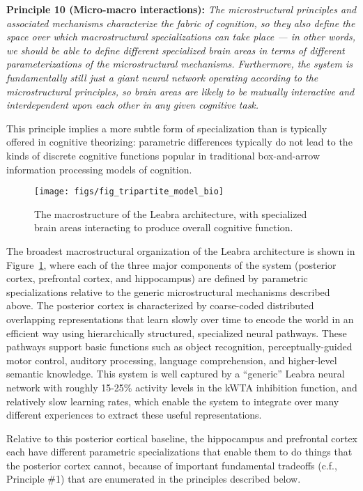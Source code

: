 \documentclass[11pt,twoside]{article}
\begin{document}
{\bf Principle 10 (Micro-macro interactions):} {\em The microstructural
  principles and associated mechanisms characterize the fabric of cognition,
  so they also define the space over which macrostructural specializations can
  take place --- in other words, we should be able to define different
  specialized brain areas in terms of different parameterizations of the
  microstructural mechanisms.  Furthermore, the system is fundamentally still
  just a giant neural network operating according to the microstructural
  principles, so brain areas are likely to be mutually interactive and
  interdependent upon each other in any given cognitive task.}

This principle implies a more subtle form of specialization than is typically
offered in cognitive theorizing: parametric differences typically do not lead
to the kinds of discrete cognitive functions popular in traditional box-and-arrow information processing models of cognition.

\begin{figure}
  \centering\texttt{[image: figs/fig\_tripartite\_model\_bio]}
  \caption{\small The macrostructure of the Leabra architecture, with specialized brain areas interacting to produce overall cognitive function.}
  \label{fig.tripartite_model}
\end{figure}

The broadest macrostructural organization of the Leabra architecture is shown
in Figure~\ref{fig.tripartite_model}, where each of the three major components
of the system (posterior cortex, prefrontal cortex, and hippocampus) are
defined by parametric specializations relative to the generic microstructural
mechanisms described above.  The posterior cortex is characterized by
coarse-coded distributed overlapping representations that learn slowly over
time to encode the world in an efficient way using hierarchically structured,
specialized neural pathways.  These pathways support basic functions such as object
recognition, perceptually-guided motor control, auditory processing, language
comprehension, and higher-level semantic knowledge.  This system is well
captured by a ``generic'' Leabra neural network with roughly 15-25\% activity
levels in the kWTA inhibition function, and relatively slow learning rates,
which enable the system to integrate over many different experiences to
extract these useful representations.

Relative to this posterior cortical baseline, the hippocampus and prefrontal
cortex each have different parametric specializations that enable them to do
things that the posterior cortex cannot, because of important fundamental
tradeoffs (c.f., Principle \#1) that are enumerated in the principles
described below.
\end{document}

